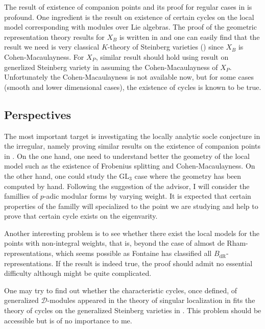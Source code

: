 \documentclass{amsart}
\newcommand{\GL}{\text{GL}}
\numberwithin{equation}{section}
\begin{document}
The result of existence of companion points and its proof for regular cases in \cite{breuil2019local} is profound. One ingredient is the result on existence of certain cycles on the local model corresponding with modules over Lie algebras. The proof of the geometric representation theory results for $X_B$ is written in \cite{riche2008geometric} and one can easily find that the result we need is very classical $K$-theory of Steinberg varieties (\cite{Chriss1997RepresentationTA}) since $X_B$ is Cohen-Macaulayness. For $X_P$, similar result should hold using result on generlized Steinberg variety in \cite{douglass2014equivariant} assuming the Cohen-Macaulayness of $X_P$. Unfortunately the Cohen-Macaulayness is not available now, but for some cases (smooth and lower dimensional cases), the existence of cycles is known to be true.
\subsection{Perspectives}
The most important target is investigating the locally analytic socle conjecture in the irregular, namely proving similar results on the existence of companion points in \cite{breuil2019local}. On the one hand, one need to understand better the geometry of the local model such as the existence of Frobenius splitting and Cohen-Macaulayness. On the other hand, one could study the $\GL_3$ case where the geometry has been computed by hand. Following the suggestion of the advisor, I will consider the famillies of $p$-adic modular forms by varying weight. It is expected that certain properties of the familly will specialized to the point we are studying and help to prove that certain cycle exists on the eigenvarity.\par
Another interesting problem is to see whether there exist the local models for the points with non-integral weights, that is, beyond the case of almost de Rham-representations, which seems possible as Fontaine has classified all $B_{\text{dR}}$-representations. If the result is indeed true, the proof should admit no essential difficulty although might be quite complicated.\par
One may try to find out whether the characteristic cycles, once defined, of generalized $\mathcal{D}$-modules appeared in the theory of singular localization in \cite{Backelin2015singular} fits the theory of cycles on the generalized Steinberg varieties in \cite{douglass2014equivariant}. This problem should be accessible but is of no importance to me.


\end{document}
